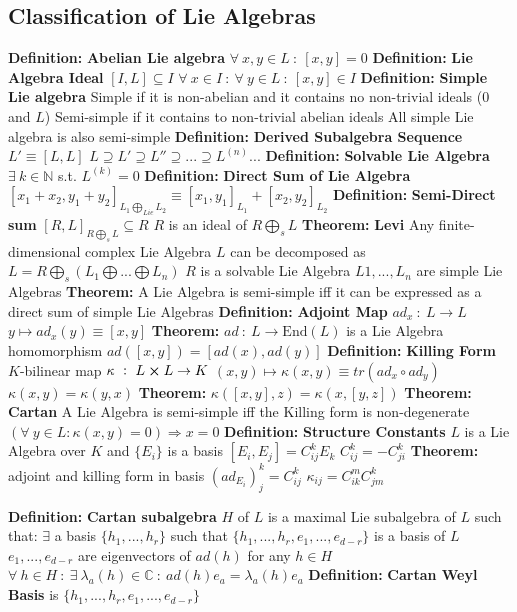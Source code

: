 \documentclass[14pt]{extarticle}
\def\Definition{{\color{blue} \textbf{Definition:} }}
\def\Theorem{{\color{red} \textbf{Theorem:} }}
\begin{document}
\begin{outline}
	\section*{Classification of Lie Algebras}
		\1	\Definition \textbf{Abelian Lie algebra}
			\2	$\forall~x,y \in L~:~[x,y] = 0$
		\1	\Definition \textbf{Lie Algebra Ideal}
			\2	$[I,L] \subseteq I$
			\2	$\forall~x \in I~:~\forall~y \in L~:~[x,y] \in I$
		\1	\Definition \textbf{Simple Lie algebra}
			\2	Simple if it is non-abelian and it contains no non-trivial ideals ($0$ and $L$)
			\2	Semi-simple if it contains to non-trivial abelian ideals
			\2	All simple Lie algebra is also semi-simple
		\1	\Definition \textbf{Derived Subalgebra Sequence}
			\2	$L' \equiv [L,L]$
			\2	$L \supseteq L' \supseteq L'' \supseteq ... \supseteq L^{(n)} ...$
		\1	\Definition \textbf{Solvable Lie Algebra}
			\2	$\exists~k \in \mathbb{N}$ s.t. $L^{(k)} = 0$
		\1	\Definition \textbf{Direct Sum of Lie Algebra}
			\2	$[x_1+x_2,y_1+y_2]_{L_1 \bigoplus_{Lie}L_2} \equiv [x_1,y_1]_{L_1} + [x_2,y_2]_{L_2}$
		\1	\Definition \textbf{Semi-Direct sum}
			\2	$[R,L]_{R \bigoplus_s L} \subseteq R$
			\2	$R$ is an ideal of $R \bigoplus_s L$
		\1	\Theorem \textbf{Levi}
			\2	Any finite-dimensional complex Lie Algebra $L$ can be decomposed as
					$L = R \bigoplus_s (L_1 \bigoplus ... \bigoplus L_n)$
			\2	$R$ is a solvable Lie Algebra
			\2	$L1,...,L_n$ are simple Lie Algebras
		\1	\Theorem A Lie Algebra is semi-simple iff it can be expressed as a direct
				sum of simple Lie Algebras
		\1	\Definition \textbf{Adjoint Map}
			\2	$ad_x~:~L \rightarrow L$
			\2	$y \mapsto ad_x(y) \equiv [x,y]$
			\2	\Theorem $ad~:~L \rightarrow \text{End}(L)$ is a Lie Algebra homomorphism
				\3	$ad([x,y]) = [ad(x),ad(y)]$
		\1	\Definition \textbf{Killing Form}
			\2	$K$-bilinear map
			\2	$\kappa~:~L \cross L \rightarrow K$
			\2	$(x,y) \mapsto \kappa(x,y) \equiv tr(ad_x \circ ad_y)$
			\2	$\kappa(x,y) = \kappa(y,x)$
			\2	\Theorem $\kappa([x,y],z) = \kappa(x,[y,z])$
			\2	\Theorem \textbf{Cartan}
				\3	A Lie Algebra is semi-simple iff the Killing form is non-degenerate
				\3	$(\forall~y \in L:\kappa(x,y) = 0) \Rightarrow x = 0$
		\1	\Definition \textbf{Structure Constants}
			\2	$L$ is a Lie Algebra over $K$ and $\{E_i\}$ is a basis
			\2	$[E_i,E_j] = C^k_{ij}E_k$
			\2	$C^k_{ij} = -C^k_{ji}$
			\2	\Theorem adjoint and killing form in basis
				\3	$(ad_{E_i})^k_j = C^k_{ij}$
				\3	$\kappa_{ij} = C^m_{ik}C^k_{jm}$
		
		\1	\Definition \textbf{Cartan subalgebra}
			\2	$H$ of $L$ is a maximal Lie subalgebra of $L$ such that:
			\2	$\exists$ a basis $\{h_1,...,h_r\}$ such that
					$\{h_1,...,h_r,e_1,...,e_{d-r}\}$ is a basis of $L$
			\2	$e_{1},...,e_{d-r}$ are eigenvectors of $ad(h)$ for any $h \in H$
				\3	$\forall~h \in H~:~\exists~\lambda_a(h) \in \mathbb{C}~:~ad(h)e_a = \lambda_a(h)e_a$
			\2	\Definition \textbf{Cartan Weyl Basis} is $\{h_1,...,h_r,e_1,...,e_{d-r}\}$
		

\end{outline}
\end{document}
